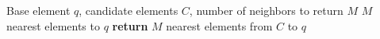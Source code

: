 \begin{algorithm}[H]
\caption{SELECT-NEIGHBORS-SIMPLE($q$, $C$, $M$)}
\begin{algorithmic}[1]
\Require Base element $q$, candidate elements $C$, number of neighbors to return $M$
\Ensure $M$ nearest elements to $q$
\State \textbf{return} $M$ nearest elements from $C$ to $q$
\end{algorithmic}
\end{algorithm}